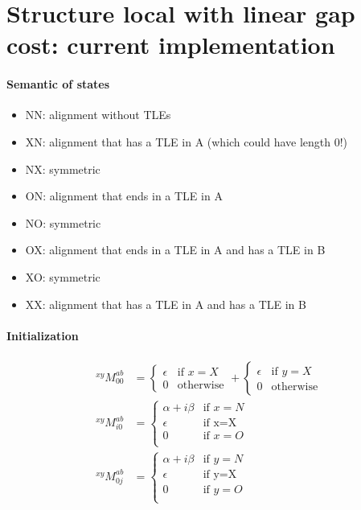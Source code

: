 \documentclass{article}
\begin{document}
\section{Structure local with linear gap cost: current implementation}

\paragraph{Semantic of states}
\begin{itemize}
\item NN: alignment without TLEs
\item XN: alignment that has a TLE in A (which could have length 0!)
\item NX: symmetric
\item ON: alignment that ends in a TLE in A
\item NO: symmetric
\item OX: alignment that ends in a TLE in A and has a TLE in B
\item XO: symmetric
\item XX: alignment that has a TLE in A and has a TLE in B
\end{itemize}

\paragraph{Initialization}

\begin{align*}
  ^{xy}M^{ab}_{00}&=
  \begin{cases}
    \epsilon & \text{if $x=X$}\\
    0 & \text{otherwise}
  \end{cases}
  +
  \begin{cases}
    \epsilon & \text{if $y=X$}\\
    0 & \text{otherwise}
  \end{cases}
  \\
  ^{xy}M^{ab}_{i0}&=
  \begin{cases}
    \alpha + i\beta & \text{if $x=N$}\\
    \epsilon & \text{if x=X}\\
    0 & \text{if $x=O$}\\
  \end{cases} \\
  ^{xy}M^{ab}_{0j}&=
  \begin{cases}
    \alpha + i\beta & \text{if $y=N$}\\
    \epsilon & \text{if y=X}\\
    0 & \text{if $y=O$}\\
  \end{cases} \\
\end{align*}
\end{document}
